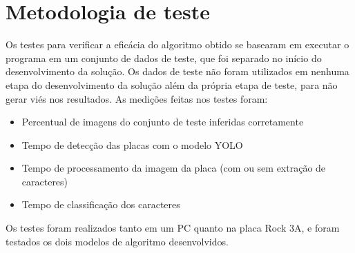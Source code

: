 \section{Metodologia de teste}

Os testes para verificar a eficácia do algoritmo obtido se basearam em executar o programa em um conjunto de dados de teste, que foi separado no início do desenvolvimento da solução. Os dados de teste não foram utilizados em nenhuma etapa do desenvolvimento da solução além da própria etapa de teste, para não gerar viés nos resultados. As medições feitas nos testes foram:

\begin{itemize}
    \item Percentual de imagens do conjunto de teste inferidas corretamente
    \item Tempo de detecção das placas com o modelo YOLO
    \item Tempo de processamento da imagem da placa (com ou sem extração de caracteres)
    \item Tempo de classificação dos caracteres
\end{itemize}

Os testes foram realizados tanto em um PC quanto na placa Rock 3A, e foram testados os dois modelos de algoritmo desenvolvidos.